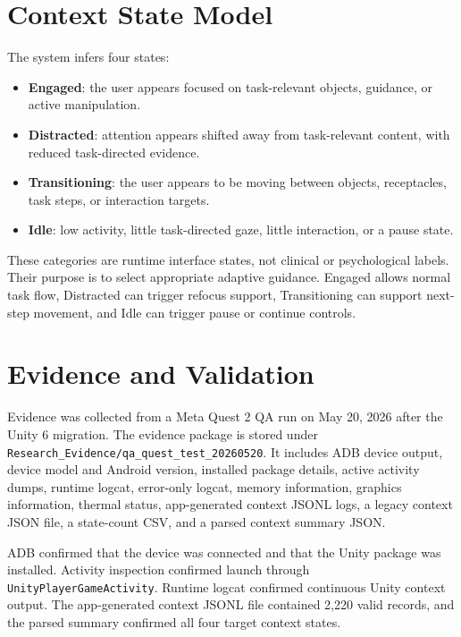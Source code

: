\documentclass[conference]{IEEEtran}
\begin{document}
\section{Context State Model}
The system infers four states:
\begin{itemize}
\item \textbf{Engaged}: the user appears focused on task-relevant objects, guidance, or active manipulation.
\item \textbf{Distracted}: attention appears shifted away from task-relevant content, with reduced task-directed evidence.
\item \textbf{Transitioning}: the user appears to be moving between objects, receptacles, task steps, or interaction targets.
\item \textbf{Idle}: low activity, little task-directed gaze, little interaction, or a pause state.
\end{itemize}

These categories are runtime interface states, not clinical or psychological labels. Their purpose is to select appropriate adaptive guidance. Engaged allows normal task flow, Distracted can trigger refocus support, Transitioning can support next-step movement, and Idle can trigger pause or continue controls.

\section{Evidence and Validation}
Evidence was collected from a Meta Quest 2 QA run on May 20, 2026 after the Unity 6 migration. The evidence package is stored under \texttt{Research\_Evidence/qa\_quest\_test\_20260520}. It includes ADB device output, device model and Android version, installed package details, active activity dumps, runtime logcat, error-only logcat, memory information, graphics information, thermal status, app-generated context JSONL logs, a legacy context JSON file, a state-count CSV, and a parsed context summary JSON.

ADB confirmed that the device was connected and that the Unity package was installed. Activity inspection confirmed launch through \texttt{UnityPlayerGameActivity}. Runtime logcat confirmed continuous Unity context output. The app-generated context JSONL file contained 2,220 valid records, and the parsed summary confirmed all four target context states.
\end{document}
